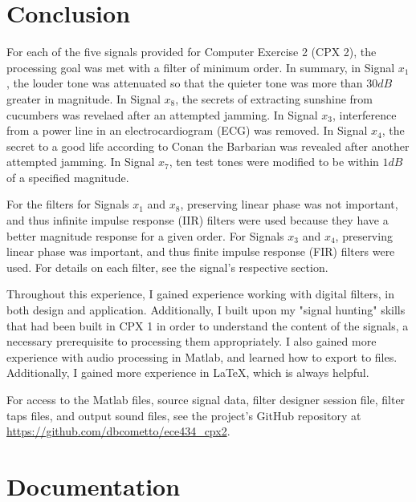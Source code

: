 
\section{Conclusion}

For each of the five signals provided for Computer Exercise 2 (CPX 2), the processing goal was met with a filter of minimum order.  In summary, in Signal $x_1$, the louder tone was attenuated so that the quieter tone was more than $30 \unit{dB}$ greater in magnitude.  In Signal $x_8$, the secrets of extracting sunshine from cucumbers was revelaed after an attempted jamming.  In Signal $x_3$, interference from a power line in an electrocardiogram (ECG) was removed.  In Signal $x_4$, the secret to a good life according to Conan the Barbarian was revealed after another attempted jamming.  In Signal $x_7$, ten test tones were modified to be within $1 \unit{dB}$ of a specified magnitude.

For the filters for Signals $x_1$ and $x_8$, preserving linear phase was not important, and thus infinite impulse response (IIR) filters were used because they have a better magnitude response for a given order.  For Signals $x_3$ and $x_4$, preserving linear phase was important, and thus finite impulse response (FIR) filters were used.  For details on each filter, see the signal's respective section.  

Throughout this experience, I gained experience working with digital filters, in both design and application.  Additionally, I built upon my "signal hunting" skills that had been built in CPX 1 in order to understand the content of the signals, a necessary prerequisite to processing them appropriately.  I also gained more experience with audio processing in Matlab, and learned how to export to  files.  Additionally, I gained more experience in \LaTeX, which is always helpful.

For access to the Matlab  files, source signal data, filter designer session  file, filter taps  files, and output  sound files, see the project's GitHub repository at \url{https://github.com/dbcometto/ece434_cpx2}.




\section*{Documentation}

